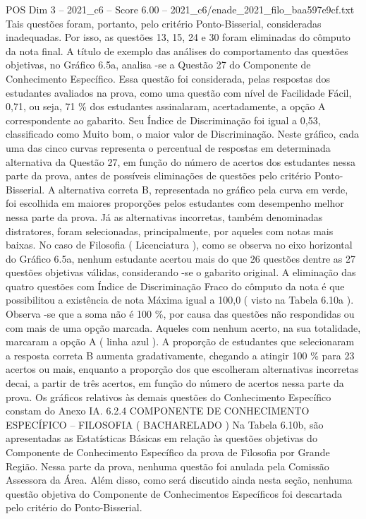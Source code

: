 \begin{textsample}{POS Dim 3 – 2021\_c6 – Score 6.00 – 2021\_c6/enade\_2021\_filo\_baa597e9cf.txt}
Tais questões foram, portanto, pelo critério Ponto-Bisserial, consideradas inadequadas.
Por isso, as questões 13, 15, 24 e 30 foram eliminadas do cômputo da nota final.
A título de exemplo das análises do comportamento das questões objetivas, no Gráfico 6.5a, analisa -se a Questão 27 do Componente de Conhecimento Específico.
Essa questão foi considerada, pelas respostas dos estudantes avaliados na prova, como uma questão com nível de Facilidade Fácil, 0,71, ou seja, 71 \% dos estudantes assinalaram, acertadamente, a opção A correspondente ao gabarito.
Seu Índice de Discriminação foi igual a 0,53, classificado como Muito bom, o maior valor de Discriminação.
Neste gráfico, cada uma das cinco curvas representa o percentual de respostas em determinada alternativa da Questão 27, em função do número de acertos dos estudantes nessa parte da prova, antes de possíveis eliminações de questões pelo critério Ponto-Bisserial.
A alternativa correta B, representada no gráfico pela curva em verde, foi escolhida em maiores proporções pelos estudantes com desempenho melhor nessa parte da prova.
Já as alternativas incorretas, também denominadas distratores, foram selecionadas, principalmente, por aqueles com notas mais baixas.
No caso de Filosofia ( Licenciatura ), como se observa no eixo horizontal do Gráfico 6.5a, nenhum estudante acertou mais do que 26 questões dentre as 27 questões objetivas válidas, considerando -se o gabarito original.
A eliminação das quatro questões com Índice de Discriminação Fraco do cômputo da nota é que possibilitou a existência de nota Máxima igual a 100,0 ( visto na Tabela 6.10a ).
Observa -se que a soma não é 100 \%, por causa das questões não respondidas ou com mais de uma opção marcada.
Aqueles com nenhum acerto, na sua totalidade, marcaram a opção A ( linha azul ).
A proporção de estudantes que selecionaram a resposta correta B aumenta gradativamente, chegando a atingir 100 \% para 23 acertos ou mais, enquanto a proporção dos que escolheram alternativas incorretas decai, a partir de três acertos, em função do número de acertos nessa parte da prova.
Os gráficos relativos às demais questões do Conhecimento Específico constam do Anexo IA. 6.2.4 COMPONENTE DE CONHECIMENTO ESPECÍFICO – FILOSOFIA ( BACHARELADO ) Na Tabela 6.10b, são apresentadas as Estatísticas Básicas em relação às questões objetivas do Componente de Conhecimento Específico da prova de Filosofia por Grande Região.
Nessa parte da prova, nenhuma questão foi anulada pela Comissão Assessora da Área.
Além disso, como será discutido ainda nesta seção, nenhuma questão objetiva do Componente de Conhecimentos Específicos foi descartada pelo critério do Ponto-Bisserial.

\end{textsample}
